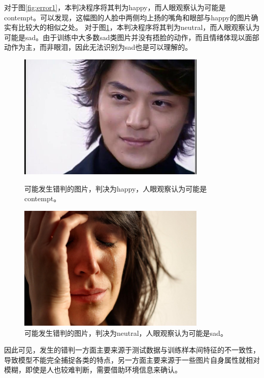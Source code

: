 \documentclass[UTF8]{ctexart}
\begin{document}
对于图\ref{fig:error1}，本判决程序将其判为happy，而人眼观察认为可能是contempt。可以发现，这幅图的人脸中两侧均上扬的嘴角和眼部与happy的图片确实有比较大的相似之处。
对于图\ref{fig:error2}，本判决程序将其判为neutral，而人眼观察认为可能是sad。由于训练中大多数sad类图片并没有捂脸的动作，而且情绪体现以面部动作为主，而非眼泪，因此无法识别为sad也是可以理解的。
\begin{figure}[ht]
\begin{minipage}[t]{0.5\textwidth}
\centering
  \includegraphics[width=0.8\textwidth]{0205.jpg}
  \caption{可能发生错判的图片，判决为happy，人眼观察认为可能是contempt。}\label{fig:error1}
\end{minipage}
\begin{minipage}[t]{0.5\textwidth}
\centering
  \includegraphics[width=0.8\textwidth]{0400.jpg}
  \caption{可能发生错判的图片，判决为neutral，人眼观察认为可能是sad。}\label{fig:error2}
\end{minipage}
\end{figure}

因此可见，发生的错判一方面主要来源于测试数据与训练样本间特征的不一致性，导致模型不能完全捕捉各类的特点，另一方面主要来源于一些图片自身属性就相对模糊，即使是人也较难判断，需要借助环境信息来确认。
\end{document}
